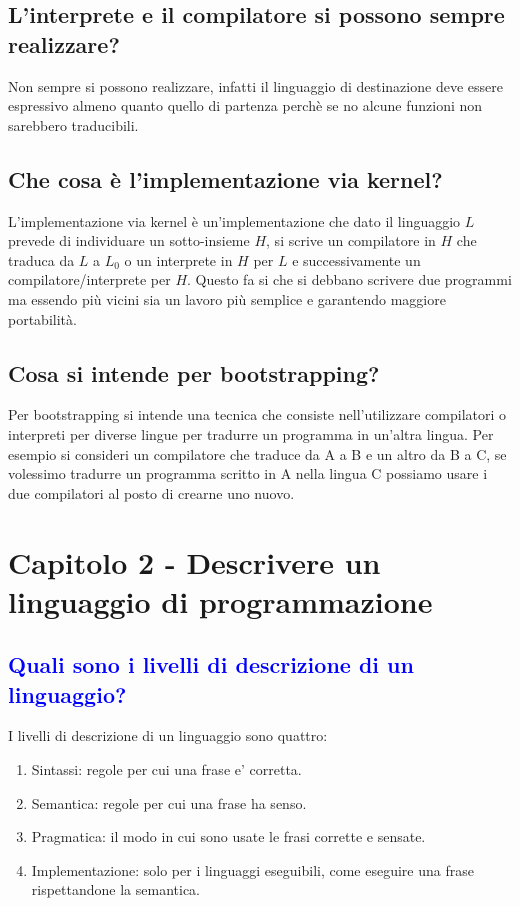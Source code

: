 \documentclass{article}
\begin{document}
\subsection{L'interprete e il compilatore si possono sempre realizzare?}
Non sempre si possono realizzare, infatti il linguaggio di destinazione deve
essere espressivo almeno quanto quello di partenza perchè se no alcune funzioni
non sarebbero traducibili.
\subsection{Che cosa è l'implementazione via kernel?}
L'implementazione via kernel è un'implementazione che dato il linguaggio $L$
prevede di individuare un sotto-insieme $H$, si scrive un compilatore in $H$
che traduca da $L$ a $L_0$ o un interprete in $H$ per $L$ e successivamente un
compilatore/interprete per $H$. Questo fa si che si debbano scrivere due
programmi ma essendo più vicini sia un lavoro più semplice e garantendo
maggiore portabilità.
\subsection{Cosa si intende per bootstrapping?}
Per bootstrapping si intende una tecnica che consiste nell'utilizzare
compilatori o interpreti per diverse lingue per tradurre un programma in
un'altra lingua. Per esempio si consideri un compilatore che traduce da A a B e
un altro da B a C, se volessimo tradurre un programma scritto in A nella lingua
C possiamo usare i due compilatori al posto di crearne uno nuovo.

\section{Capitolo 2 - Descrivere un linguaggio di programmazione}
\subsection{\textcolor{blue}{Quali sono i livelli di descrizione di un linguaggio?}}
I livelli di descrizione di un linguaggio sono quattro:
\begin{enumerate}
    \item Sintassi: regole per cui una frase e' corretta.
    \item Semantica: regole per cui una frase ha senso.
    \item Pragmatica: il modo in cui sono usate le frasi corrette e sensate.
    \item Implementazione: solo per i linguaggi eseguibili, come eseguire una frase
          rispettandone la semantica.
\end{enumerate}
\end{document}
